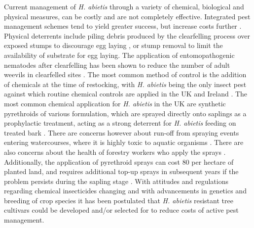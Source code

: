 \documentclass[a4paper, 11pt]{article}
\newcommand{\textapprox}{\raisebox{0.5ex}{\texttildelow}}
\begin{document}
Current management of \textit{H. abietis} through a variety of chemical, biological and physical measures, can be costly and are not completely effective. Integrated pest management schemes tend to yield greater success, but increase costs further \citep{Willoughby2004}. Physical deterrents include piling debris produced by the clearfelling process over exposed stumps to discourage egg laying \citep{Rahman2015}, or stump removal to limit the availability of substrate for egg laying. The application of entomopathogenic nematodes after clearfelling has been shown to reduce the number of adult weevils in clearfelled sites \citep{Dillon2006, Kapranas2017, Williams2013}. The most common method of control is the addition of chemicals at the time of restocking, with \textit{H. abietis} being the only insect pest against which routine chemical controls are applied in the UK and Ireland \citep{Willoughby2004, Willoughby2017}. The most common chemical application for \textit{H. abietis} in the UK are synthetic pyrethroids of various formulation, which are sprayed directly onto saplings as a prophylactic treatment, acting as a strong deterrent for \textit{H. abietis} feeding on treated bark \citep{Rose2005}. There are concerns however about run-off from spraying events entering watercourses, where it is highly toxic to aquatic organisms \citep{Willoughby2017, Mian1992, Antwi2015}. There are also concerns about the health of forestry workers who apply the sprays \citep{Rose2002}. Additionally, the application of pyrethroid sprays can cost \textapprox{}\textsterling{}80 per hectare of planted land, and requires additional top-up sprays in subsequent years if the problem persists during the sapling stage \citep{Willoughby2017}. With attitudes and regulations regarding chemical insecticides changing and with advancements in genetics and breeding of crop species it has been postulated that \textit{H. abietis} resistant tree cultivars could be developed and/or selected for to reduce costs of active pest management.
\end{document}
